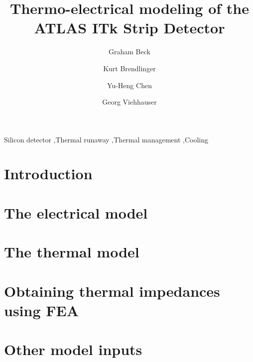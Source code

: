 \documentclass[preprint]{elsarticle/elsarticle}
\begin{document}
\begin{frontmatter}

\title{Thermo-electrical modeling of the ATLAS ITk Strip Detector}
\author[1]{Graham Beck}      %
\author[2]{Kurt Brendlinger} %
\author[2]{Yu-Heng Chen}     %
\author[3]{Georg Viehhauser} %

\address[1]{Queen Mary University of London, London, UK}
\address[2]{Deutsches Elektronen-Synchrotron DESY, Notkestra{\ss}e 85, 22607 Hamburg}
\address[3]{Oxford University, Oxford, England, UK}

\begin{abstract}

\end{abstract}

\begin{keyword}
Silicon detector \sep Thermal runaway \sep Thermal management \sep Cooling
\end{keyword}

\end{frontmatter}

\section{Introduction}


\section{The electrical model}


\section{The thermal model}


\section{Obtaining thermal impedances using FEA}


\section{Other model inputs}

\end{document}
